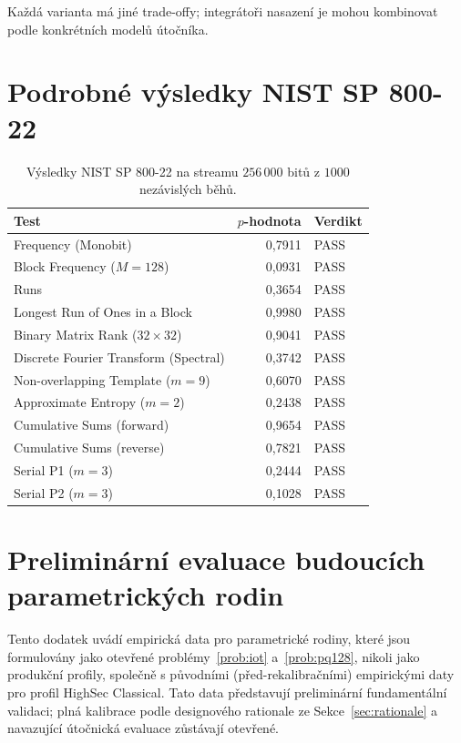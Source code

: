 \documentclass[11pt,a4paper]{article}
\begin{document}
Každá varianta má jiné trade-offy; integrátoři nasazení je mohou kombinovat podle konkrétních modelů útočníka.

\section{Podrobné výsledky NIST SP 800-22}\label{app:nist}

\begin{table}[ht]
\centering
\small
\begin{tabular}{lrl}
\toprule
Test & $p$-hodnota & Verdikt \\
\midrule
Frequency (Monobit) & 0{,}7911 & PASS \\
Block Frequency ($M=128$) & 0{,}0931 & PASS \\
Runs & 0{,}3654 & PASS \\
Longest Run of Ones in a Block & 0{,}9980 & PASS \\
Binary Matrix Rank ($32 \times 32$) & 0{,}9041 & PASS \\
Discrete Fourier Transform (Spectral) & 0{,}3742 & PASS \\
Non-overlapping Template ($m=9$) & 0{,}6070 & PASS \\
Approximate Entropy ($m=2$) & 0{,}2438 & PASS \\
Cumulative Sums (forward) & 0{,}9654 & PASS \\
Cumulative Sums (reverse) & 0{,}7821 & PASS \\
Serial P1 ($m=3$) & 0{,}2444 & PASS \\
Serial P2 ($m=3$) & 0{,}1028 & PASS \\
\bottomrule
\end{tabular}
\caption{Výsledky NIST SP 800-22 na streamu $256\,000$ bitů z $1000$ nezávislých běhů.}
\label{tab:nist}
\end{table}

\section{Preliminární evaluace budoucích parametrických rodin}\label{app:preliminary}

Tento dodatek uvádí empirická data pro parametrické rodiny, které jsou formulovány jako otevřené problémy~\ref{prob:iot} a~\ref{prob:pq128}, nikoli jako produkční profily, společně s původními (před-rekalibračními) empirickými daty pro profil HighSec Classical. Tato data představují preliminární fundamentální validaci; plná kalibrace podle designového rationale ze Sekce~\ref{sec:rationale} a navazující útočnická evaluace zůstávají otevřené.
\end{document}
